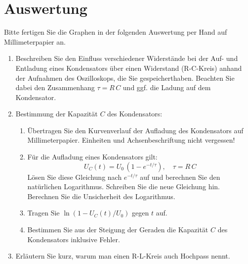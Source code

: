 \section{Auswertung} 

\begin{hint}
	Bitte fertigen Sie die Graphen in der folgenden Auswertung per Hand auf Millimeterpapier an.
\end{hint}

\begin{enumerate}
 \item Beschreiben Sie den Einfluss verschiedener Widerstände bei der Auf- und Entladung eines Kondensators über einen Widerstand (R-C-Kreis) anhand der Aufnahmen des Oszilloskops, die Sie gespeicherthaben. Beachten Sie dabei den Zusammenhang $\tau = R\,C$ und ggf. die Ladung auf dem Kondensator.
 \item Bestimmung der Kapazität $C$ des Kondensators:
  \begin{enumerate}
   \item Übertragen Sie den Kurvenverlauf der Aufladung des Kondensators auf Millimeterpapier. Einheiten und Achsenbeschriftung nicht vergessen!
   \item Für die Aufladung eines Kondensators gilt:
    \begin{equation}
     U_C(t) = U_0\, \left(1-e^{-t/\tau}\right), \quad \tau = R\, C
    \end{equation}
		Lösen Sie diese Gleichung nach $e^{-t/\tau}$ auf und berechnen Sie den natürlichen Logarithmus. Schreiben Sie die neue Gleichung hin. Berechnen Sie die Unsicherheit des Logarithmus.
   \item Tragen Sie $\ln\left(1-U_C(t)/U_0\right)$ gegen $t$ auf. 
   \item Bestimmen Sie aus der Steigung der Geraden die Kapazität $C$ des Kondensators inklusive Fehler. %
  \end{enumerate}
 \item Erläutern Sie kurz, warum man einen R-L-Kreis auch Hochpass nennt.
\end{enumerate}